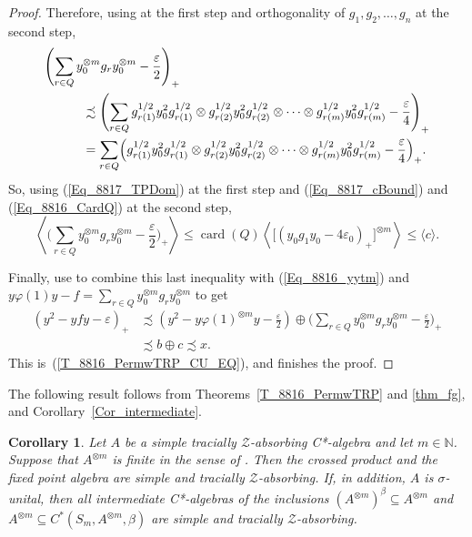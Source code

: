 \documentclass[11pt]{amsart}
\theoremstyle{plain}
\newtheorem{corollary}[theorem]{Corollary}
\theoremstyle{definition}
\theoremstyle{remark}
\numberwithin{equation}{section}
\newcommand{\ep}{\varepsilon}
\newcommand{\ph}{\varphi}
\newcommand{\card}{{\operatorname{card}}}
\begin{document}
\begin{proof}
Therefore, using \cite[Corollary~1.6]{Ph14}
at the first step
and orthogonality of $g_1, g_2, \ldots, g_n$
at the second step,
%
\begin{align*}
& \Biggl( \sum_{r \in Q} y_0^{\otimes m} g_r y_0^{\otimes m}
   - \frac{\ep}{2} \Biggr)_{+}
\\
& \hspace*{3em} {\mbox{}}
  \precsim
  \Biggl( \sum_{r \in Q} g_{r (1)}^{1/2} y_0^2 g_{r (1)}^{1/2}
     \otimes g_{r (2)}^{1/2} y_0^2 g_{r (2)}^{1/2}
     \otimes \cdots
     \otimes g_{r (m)}^{1/2} y_0^2 g_{r (m)}^{1/2}
   - \frac{\ep}{4} \Biggr)_{+}
\\
& \hspace*{3em} {\mbox{}}
  = \sum_{r \in Q} \Bigl( g_{r (1)}^{1/2} y_0^2 g_{r (1)}^{1/2}
     \otimes g_{r (2)}^{1/2} y_0^2 g_{r (2)}^{1/2}
     \otimes \cdots
     \otimes g_{r (m)}^{1/2} y_0^2 g_{r (m)}^{1/2}
   - \frac{\ep}{4} \Bigr)_{+}.
\end{align*}
%
So,
using (\ref{Eq_8817_TPDom})
at the first step
and (\ref{Eq_8817_cBound}) and (\ref{Eq_8816_CardQ})
at the second step,
\[
\left\langle \Biggl( \sum_{r \in Q} y_0^{\otimes m} g_r y_0^{\otimes m}
   - \frac{\ep}{2} \Biggr)_{+} \right\rangle
\leq \card (Q) \left\langle
   \bigl[ ( y_0 g_1 y_0 - 4 \ep_0 )_{+} \bigr]^{\otimes m}
          \right\rangle
\leq \langle c \rangle.
\]

Finally, use
\cite[Lemma 1.5]{Ph14} to combine
this last inequality with
(\ref{Eq_8816_yytm})
and
$y \ph (1) y - f = \sum_{r \in Q} y_0^{\otimes m} g_r y_0^{\otimes m}$
to get
%
\begin{align*}
( y^2 - y f y - \ep )_{+}
& \precsim
   \left( y^2 - y \ph (1)^{\otimes m} y - \tfrac{\ep}{2} \right)
   \oplus \Biggl( \sum_{r \in Q} y_0^{\otimes m} g_r y_0^{\otimes m}
     - \frac{\ep}{2} \Biggr)_{+}
\\
&\precsim b \oplus c
 \precsim x.
\end{align*}
%
This is~(\ref{T_8816_PermwTRP_CU_EQ}),
and finishes the proof.
\end{proof}

The following result follows from Theorems~\ref{T_8816_PermwTRP}
and \ref{thm_fg}, and Corollary~\ref{Cor_intermediate}.


\begin{corollary}\label{cor_per_tz_fin}
Let $A$ be a simple  
tracially $\mathcal{Z}$-absorbing C*-algebra  and let
 $m\in\mathbb{N}$. Suppose that $A^{\otimes m}$ is finite
 in the sense of \cite[Definition~7.1]{AGJP21}. Then
 the crossed product and the fixed point algebra
are simple and tracially $\mathcal{Z}$-absorbing.
 If, in addition, $A$ is $\sigma$-unital,
 then all intermediate C*-algebras of the inclusions
$(A^{\otimes m})^\beta \subseteq A^{\otimes m}$ and 
$A^{\otimes m} \subseteq C^*(S_m, A^{\otimes m},\beta)$
are simple and tracially $\mathcal{Z}$-absorbing. 
\end{corollary}
\end{document}

